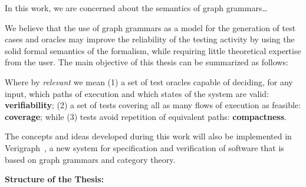 In this work, we are concerned about the semantics of graph grammars\ldots





We believe that the use of graph grammars as a model for the generation of test cases and oracles may improve the reliability of the testing activity by using the solid formal semantics of the formalism, while requiring little theoretical expertise from the user. The main objective of this thesis can be summarized as follows:

\begin{intuition}
\end{intuition}\hfill\break

Where by \emph{relevant} we mean (1) a set of test oracles capable of deciding, for any input, which paths of execution and which states of the system are valid: \textbf{verifiability}; (2) a set of tests covering all as many flows of execution as feasible: \textbf{coverage}; while (3) tests avoid repetition of equivalent paths: \textbf{compactness}.

The concepts and ideas developed during this work will also be implemented in Verigraph~\cite{verigraph,Costa2016}, a new system for specification and verification of software that is based on graph grammars and category theory.



\hfill \break
\textbf{Structure of the Thesis:}

